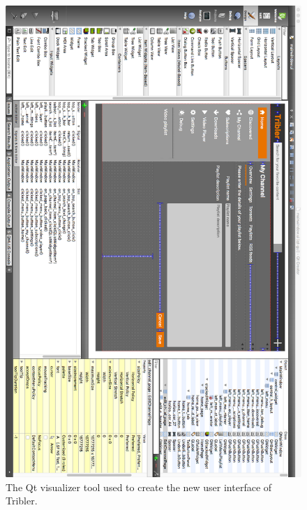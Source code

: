 \begin{figure}[h!]
	\centering
	\includegraphics[width=1.0\columnwidth]{images/improving_qa/qt_designer}
	\caption{The Qt visualizer tool used to create the new user interface of Tribler.}
	\label{fig:qt-visualizer}
\end{figure}